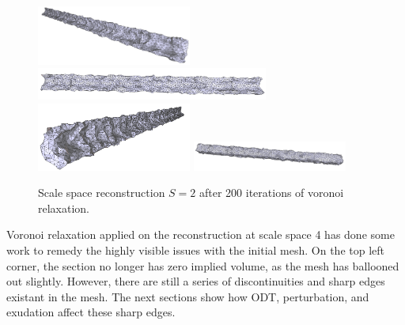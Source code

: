 \documentclass[12pt]{drexelthesis}
\begin{document}
\begin{figure}[!ht]	
	\centering
		\includegraphics[width=2in]{simulated-lab-scan/2cmnoise/optimized/scalespace2lloyd00.png}
		\includegraphics[width=3in]{simulated-lab-scan/2cmnoise/optimized/scalespace2lloyd01.png}
		\includegraphics[width=2in]{simulated-lab-scan/2cmnoise/optimized/scalespace2lloyd02.png}
		\includegraphics[width=2in]{simulated-lab-scan/2cmnoise/optimized/scalespace2lloyd03.png}
		\caption[Scale space reconstruction $S = 2$ after 200 iterations of voronoi relaxation]{\centering Scale space reconstruction $S = 2$ after 200 iterations of voronoi relaxation.}
	\label{2cmnoise:scalespace2lloyd}
\end{figure}

Voronoi relaxation applied on the reconstruction at scale space 4 has done some work to remedy the highly visible issues with the initial mesh. On the top left corner, the section no longer has zero implied volume, as the mesh has ballooned out slightly. However, there are still a series of discontinuities and sharp edges existant in the mesh. The next sections show how ODT, perturbation, and exudation affect these sharp edges.
\end{document}
